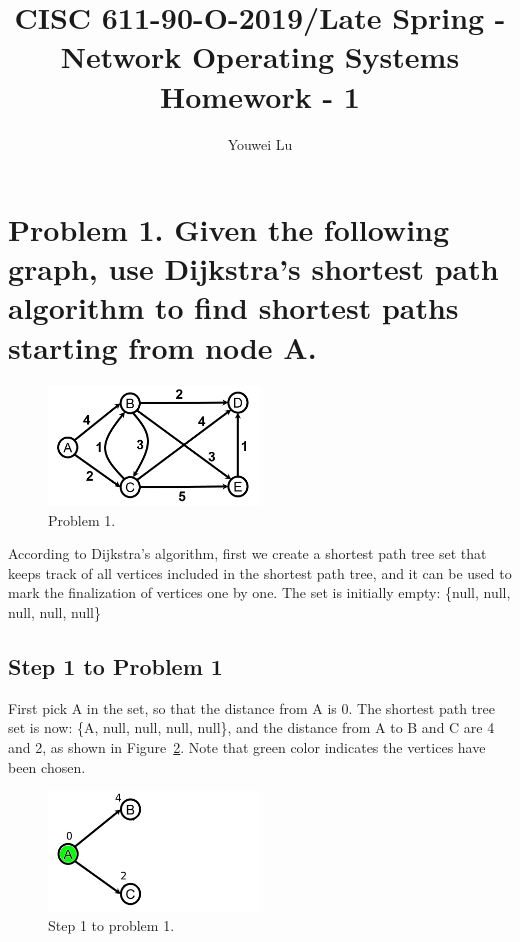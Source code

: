 \documentclass[doc,natbib,12pt]{article}
\title{CISC 611-90-O-2019/Late Spring - Network Operating Systems \\ Homework - 1}
\author{Youwei Lu}
\date{}
\begin{document}
	\maketitle
	
	
	\section*{Problem 1. Given the following graph, use Dijkstra's shortest path algorithm to find shortest paths starting from node A. }
	
	\begin{figure}[htpb]
		\centering
		\includegraphics[width=0.5\textwidth]{1.png}
		\caption{\label{fig:problem1}Problem 1.}
	\end{figure}
	
	According to Dijkstra's algorithm, first we create a shortest path tree set that keeps track of all vertices included in the shortest path tree, and it can be used to mark the finalization of vertices one by one. The set is initially empty: \{null, null, null, null, null\}
	
	\subsection*{Step 1 to Problem 1}
	First pick A in the set, so that the distance from A is 0. The shortest path tree set is now: \{A, null, null, null, null\}, and the distance from A to B and C are 4 and 2, as shown in Figure~\ref{fig:problem1-step1}. Note that green color indicates the vertices have been chosen.
	
	\begin{figure}[htpb]
		\centering
		\includegraphics[width=0.5\textwidth]{1-1.png}
		\caption{\label{fig:problem1-step1}Step 1 to problem 1.}
	\end{figure}
	
\end{document}
